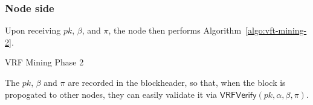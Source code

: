 \subsubsection{Node side\\}

Upon receiving $pk$, $\beta$, and $\pi$, the node then performs Algorithm~\ref{algo:vft-mining-2}.

\begin{algorithm}[H]
\caption{VRF Mining Phase 2}
\label{algo:vft-mining-2}
\SetAlgoLined
{}
\end{algorithm}

The $pk$, $\beta$ and $\pi$ are recorded in the blockheader, so that, when the block is propogated to other nodes, they can easily validate it via $\mathsf{VRFVerify}(pk, \alpha, \beta, \pi)$.


